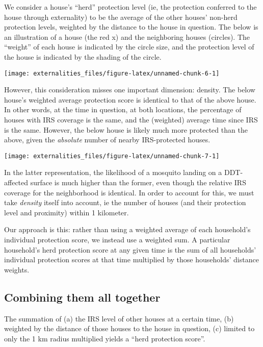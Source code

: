 \documentclass[]{article}
\begin{document}
We consider a house's ``herd'' protection level (ie, the protection
conferred to the house through externality) to be the average of the
other houses' non-herd protection levels, weighted by the distance to
the house in question. The below is an illustration of a house (the red
x) and the neighboring houses (circles). The ``weight'' of each house is
indicated by the circle size, and the protection level of the house is
indicated by the shading of the circle.

\begin{center}\texttt{[image: externalities\_files/figure-latex/unnamed-chunk-6-1]} \end{center}

However, this consideration misses one important dimension: density. The
below house's weighted average protection score is identical to that of
the above house. In other words, at the time in question, at both
locations, the percentage of houses with IRS coverage is the same, and
the (weighted) average time since IRS is the same. However, the below
house is likely much more protected than the above, given the
\emph{absolute} number of nearby IRS-protected houses.

\begin{center}\texttt{[image: externalities\_files/figure-latex/unnamed-chunk-7-1]} \end{center}

In the latter representation, the likelihood of a mosquito landing on a
DDT-affected surface is much higher than the former, even though the
relative IRS coverage for the neighborhood is identical. In order to
account for this, we must take \emph{density} itself into account, ie
the number of houses (and their protection level and proximity) within 1
kilometer.

Our approach is this: rather than using a weighted average of each
household's individual protection score, we instead use a weighted sum.
A particular household's herd protection score at any given time is the
sum of all households' individual protection scores at that time
multiplied by those households' distance weights.

\subsection{Combining them all
together}\label{combining-them-all-together}

The summation of (a) the IRS level of other houses at a certain time,
(b) weighted by the distance of those houses to the house in question,
(c) limited to only the 1 km radius multiplied yields a ``herd
protection score''.
\end{document}

